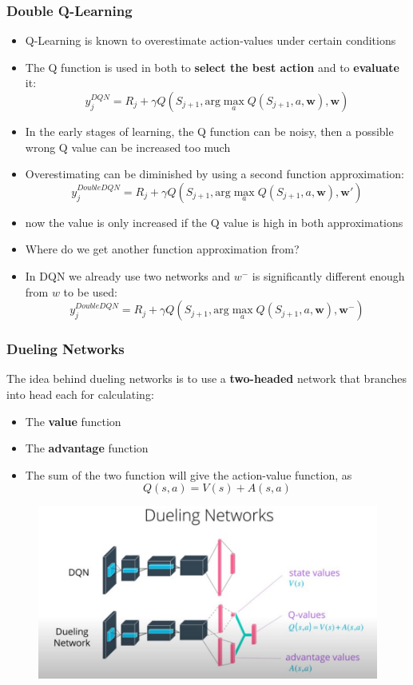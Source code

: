 \subsubsection{Double Q-Learning}
\begin{itemize}
    \item Q-Learning is known to overestimate action-values under certain conditions
    \item The Q function is used in both to \textbf{select the best action} and to \textbf{evaluate} it:
    \[
    y_j^{DQN} = R_j + \gamma Q(S_{j+1},\text{arg}\max_a Q(S_{j+1},a,\boldsymbol{w}),\boldsymbol{w})
    \]
    \item In the early stages of learning, the Q function can be noisy, then a possible wrong Q value can be increased too much
    \item Overestimating can be diminished by using a second function approximation:
    \[
    y_j^{DoubleDQN} = R_j + \gamma Q(S_{j+1},\text{arg}\max_a Q(S_{j+1},a,\boldsymbol{w}),\boldsymbol{w}')
    \]
    \item now the value is only increased if the Q value is high in both approximations
    \item Where do we get another function approximation from?
    \item In DQN we already use two networks and \(w^-\) is significantly different enough from \(w\) to be used:
    \[
    y_j^{DoubleDQN} = R_j + \gamma Q(S_{j+1},\text{arg}\max_a Q(S_{j+1},a,\boldsymbol{w}),\boldsymbol{w}^-)
    \]
\end{itemize}
\subsubsection{Dueling Networks}
The idea behind dueling networks is to use a \textbf{two-headed} network that branches into head each for calculating:
\begin{itemize}
    \item The \textbf{value} function
    \item The \textbf{advantage} function
    \item The sum of the two function will give the action-value function, as
    \[
    Q(s,a) = V(s) + A(s,a)
    \]
\end{itemize}
\begin{figure}[!h]
    \includegraphics[width = \columnwidth]{figures/DeepReinforcementLearning3/DuelingNetworks.png}
\end{figure}
